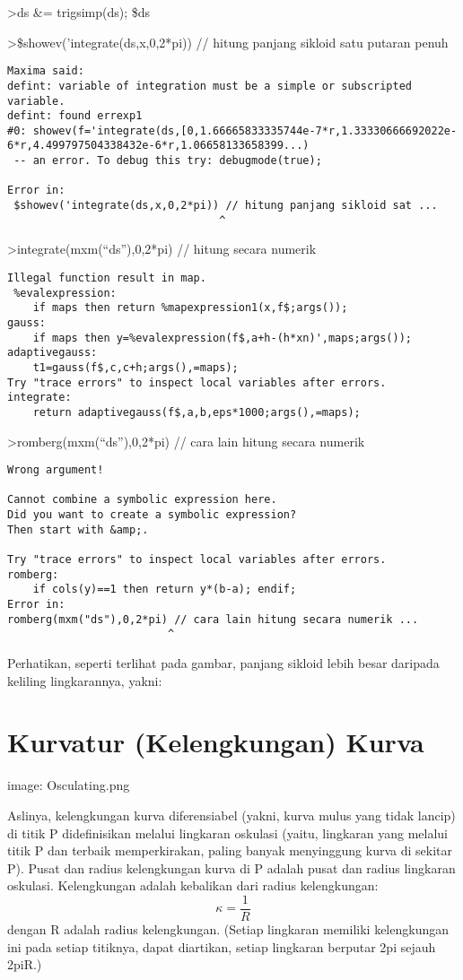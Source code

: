 \documentclass[
]{book}
\begin{document}
\textgreater ds \&= trigsimp(ds); \$ds

\textgreater\$showev('integrate(ds,x,0,2*pi)) // hitung panjang sikloid satu putaran penuh

\begin{verbatim}
Maxima said:
defint: variable of integration must be a simple or subscripted variable.
defint: found errexp1
#0: showev(f='integrate(ds,[0,1.66665833335744e-7*r,1.33330666692022e-6*r,4.499797504338432e-6*r,1.06658133658399...)
 -- an error. To debug this try: debugmode(true);

Error in:
 $showev('integrate(ds,x,0,2*pi)) // hitung panjang sikloid sat ...
                                 ^
\end{verbatim}

\textgreater integrate(mxm(``ds''),0,2*pi) // hitung secara numerik

\begin{verbatim}
Illegal function result in map.
 %evalexpression:
    if maps then return %mapexpression1(x,f$;args());
gauss:
    if maps then y=%evalexpression(f$,a+h-(h*xn)',maps;args());
adaptivegauss:
    t1=gauss(f$,c,c+h;args(),=maps);
Try "trace errors" to inspect local variables after errors.
integrate:
    return adaptivegauss(f$,a,b,eps*1000;args(),=maps);
\end{verbatim}

\textgreater romberg(mxm(``ds''),0,2*pi) // cara lain hitung secara numerik

\begin{verbatim}
Wrong argument!

Cannot combine a symbolic expression here.
Did you want to create a symbolic expression?
Then start with &amp;.

Try "trace errors" to inspect local variables after errors.
romberg:
    if cols(y)==1 then return y*(b-a); endif;
Error in:
romberg(mxm("ds"),0,2*pi) // cara lain hitung secara numerik ...
                         ^
\end{verbatim}

Perhatikan, seperti terlihat pada gambar, panjang sikloid lebih besar daripada keliling lingkarannya, yakni:

\section{Kurvatur (Kelengkungan) Kurva}\label{kurvatur-kelengkungan-kurva}

image: Osculating.png

Aslinya, kelengkungan kurva diferensiabel (yakni, kurva mulus yang tidak lancip) di titik P didefinisikan melalui lingkaran oskulasi (yaitu, lingkaran yang melalui titik P dan terbaik memperkirakan, paling banyak menyinggung kurva di sekitar P). Pusat dan radius kelengkungan kurva di P adalah pusat dan radius lingkaran oskulasi. Kelengkungan adalah kebalikan dari radius kelengkungan: \[\kappa =\frac {1}{R}\]dengan R adalah radius kelengkungan. (Setiap lingkaran memiliki kelengkungan ini pada setiap titiknya, dapat diartikan, setiap lingkaran berputar 2pi sejauh 2piR.)
\end{document}
